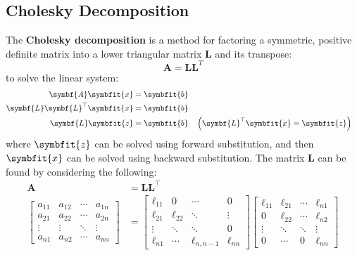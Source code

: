 \documentclass{article}
\begin{document}
\subsection{Cholesky Decomposition}
The \textbf{Cholesky decomposition} is a method for factoring a
symmetric, positive definite matrix into a lower triangular matrix
\(\symbf{L}\) and its transpose:
\begin{equation*}
    \symbf{A} = \symbf{L} \symbf{L}^T
\end{equation*}
to solve the linear system:
\begin{align*}
    \symbf{A} \symbfit{x}                & = \symbfit{b}                                                              \\
    \symbf{L} \symbf{L}^\top \symbfit{x} & = \symbfit{b}                                                              \\
    \symbf{L} \symbfit{z}                & = \symbfit{b} &  & \left( \symbf{L}^\top \symbfit{x} = \symbfit{z} \right)
\end{align*}
where \(\symbfit{z}\) can be solved using forward substitution, and then
\(\symbfit{x}\) can be solved using backward substitution. The matrix
\(\symbf{L}\) can be found by considering the following:
\begin{align*}
    \symbf{A} & = \symbf{L} \symbf{L}^\top \\
    \begin{bmatrix*}
        a_{11} & a_{12} & \cdots & a_{1n} \\
        a_{21} & a_{22} & \cdots & a_{2n} \\
        \vdots & \vdots & \ddots & \vdots \\
        a_{n1} & a_{n2} & \cdots & a_{nn}
    \end{bmatrix*}
              & =
    \begin{bmatrix*}
        \ell_{11} & 0      & \cdots & 0      \\
        \ell_{21} & \ell_{22} & \ddots & \vdots      \\
        \vdots & \ddots & \ddots & 0 \\
        \ell_{n1} & \cdots & \ell_{n,n-1} & \ell_{nn}
    \end{bmatrix*}
    \begin{bmatrix*}
        \ell_{11} & \ell_{21} & \cdots & \ell_{n1} \\
        0      & \ell_{22} & \cdots & \ell_{n2} \\
        \vdots & \ddots & \ddots & \vdots \\
        0      & \cdots & 0      & \ell_{nn}
    \end{bmatrix*}
\end{align*}
\end{document}
